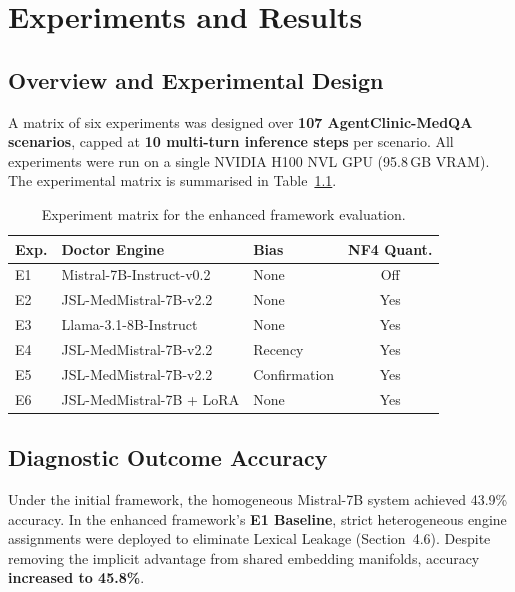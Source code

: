 \chapter{Experiments and Results}
\label{Chapter6}

\section{Overview and Experimental Design}

A matrix of six experiments was designed over \textbf{107 AgentClinic-MedQA scenarios}, capped at \textbf{10 multi-turn inference steps} per scenario. All experiments were run on a single NVIDIA H100 NVL GPU (95.8\,GB VRAM). The experimental matrix is summarised in Table~\ref{tab:exp_matrix}.


\begin{table}[htbp]
\centering
\caption{Experiment matrix for the enhanced framework evaluation.}
\label{tab:exp_matrix}
\begin{tabular}{@{}lllc@{}}
\toprule
\textbf{Exp.} & \textbf{Doctor Engine} & \textbf{Bias} & \textbf{NF4 Quant.} \\
\midrule
E1 & Mistral-7B-Instruct-v0.2 & None         & Off \\
E2 & JSL-MedMistral-7B-v2.2   & None         & Yes \\
E3 & Llama-3.1-8B-Instruct    & None         & Yes \\
E4 & JSL-MedMistral-7B-v2.2   & Recency      & Yes \\
E5 & JSL-MedMistral-7B-v2.2   & Confirmation & Yes \\
E6 & JSL-MedMistral-7B + LoRA  & None         & Yes \\
\bottomrule
\end{tabular}
\end{table}

\section{Diagnostic Outcome Accuracy}

Under the initial framework, the homogeneous Mistral-7B system achieved 43.9\% accuracy. In the enhanced framework's \textbf{E1 Baseline}, strict heterogeneous engine assignments were deployed to eliminate Lexical Leakage (Section~4.6). Despite removing the implicit advantage from shared embedding manifolds, accuracy \textbf{increased to 45.8\%}.

